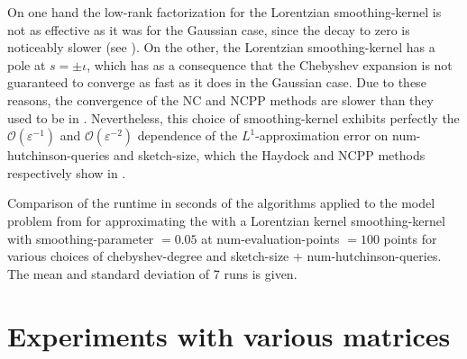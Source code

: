 On one hand the low-rank factorization for the Lorentzian \gls{smoothing-kernel}
is not as effective as it was for the Gaussian case, since the decay to zero
is noticeably slower (see ). On the
other, the Lorentzian \gls{smoothing-kernel} has a pole at $s = \pm \iota$, which
has as a consequence that the Chebyshev expansion is not guaranteed to converge
as fast as it does in the Gaussian case.%
Due to these reasons, the convergence of the \gls{NC} and \gls{NCPP} methods
are slower than they used to be in .
Nevertheless, this choice of \gls{smoothing-kernel} exhibits perfectly the 
$\mathcal{O}(\varepsilon^{-1})$ and $\mathcal{O}(\varepsilon^{-2})$
dependence of the $L^1$-approximation error on \gls{num-hutchinson-queries}
and \gls{sketch-size}, which the Haydock and \gls{NCPP}
methods respectively show in .\\

\begin{table}[ht]
    \caption{Comparison of the runtime in seconds of the algorithms applied to the model problem
    from 
    for approximating the  with a Lorentzian kernel \gls{smoothing-kernel} with
    \gls{smoothing-parameter} $=0.05$ at \gls{num-evaluation-points} $=100$
    points for various choices of \gls{chebyshev-degree} and \gls{sketch-size} $+$ \gls{num-hutchinson-queries}.
    The mean and standard deviation of 7 runs is given.}
    \label{tab:5-experiments-timing-haydock}
   
\end{table}


\clearpage
\section{Experiments with various matrices}
\label{sec:5-experiments-various-matrices}

